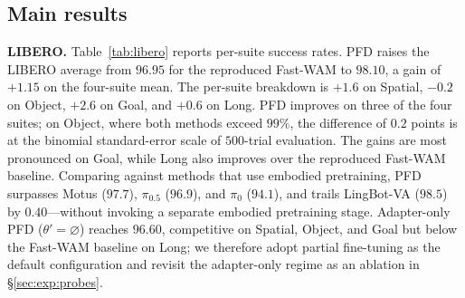 \documentclass{article}
\begin{document}
\subsection{Main results}
\label{sec:exp:main}

\noindent\textbf{LIBERO.} Table~\ref{tab:libero} reports per-suite success rates. PFD raises the LIBERO average from $96.95$ for the reproduced Fast-WAM to $98.10$, a gain of $+1.15$ on the four-suite mean. The per-suite breakdown is $+1.6$ on Spatial, $-0.2$ on Object, $+2.6$ on Goal, and $+0.6$ on Long. PFD improves on three of the four suites; on Object, where both methods exceed $99\%$, the difference of $0.2$ points is at the binomial standard-error scale of $500$-trial evaluation. The gains are most pronounced on Goal, while Long also improves over the reproduced Fast-WAM baseline. Comparing against methods that use embodied pretraining, PFD surpasses Motus ($97.7$), $\pi_{0.5}$ ($96.9$), and $\pi_0$ ($94.1$), and trails LingBot-VA ($98.5$) by $0.40$---without invoking a separate embodied pretraining stage. Adapter-only PFD ($\theta' = \varnothing$) reaches $96.60$, competitive on Spatial, Object, and Goal but below the Fast-WAM baseline on Long; we therefore adopt partial fine-tuning as the default configuration and revisit the adapter-only regime as an ablation in \S\ref{sec:exp:probes}.
\end{document}
